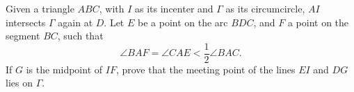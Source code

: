 Given a triangle $ABC$,  with $I$ as its incenter and $\Gamma$ as its circumcircle, $AI$ intersects $\Gamma$ again at $D$. Let $E$ be a point on the arc $BDC$,  and $F$ a point on the segment $BC$,  such that \[\angle BAF=\angle CAE < \frac{1}{2} \angle BAC.\] If $G$ is the midpoint of $IF$,  prove that the meeting point of the lines $EI$ and $DG$ lies on $\Gamma$.

